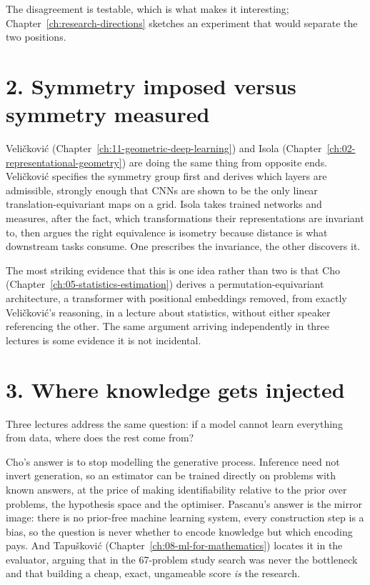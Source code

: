The disagreement is testable, which is what makes it interesting;
Chapter~\ref{ch:research-directions} sketches an experiment that would separate the two positions.

\section*{2. Symmetry imposed versus symmetry measured}

Veli\v{c}kovi\'{c} (Chapter~\ref{ch:11-geometric-deep-learning}) and Isola
(Chapter~\ref{ch:02-representational-geometry}) are doing the same thing from opposite ends.
Veli\v{c}kovi\'{c} specifies the symmetry group first and derives which layers are admissible,
strongly enough that CNNs are shown to be the only linear translation-equivariant maps on a grid.
Isola takes trained networks and measures, after the fact, which transformations their
representations are invariant to, then argues the right equivalence is isometry because distance is
what downstream tasks consume. One prescribes the invariance, the other discovers it.

The most striking evidence that this is one idea rather than two is that Cho
(Chapter~\ref{ch:05-statistics-estimation}) derives a permutation-equivariant architecture, a
transformer with positional embeddings removed, from exactly Veli\v{c}kovi\'{c}'s reasoning, in a
lecture about statistics, without either speaker referencing the other. The same argument
arriving independently in three lectures is some evidence it is not incidental.

\section*{3. Where knowledge gets injected}

Three lectures address the same question: if a model cannot learn everything from data, where does
the rest come from?

Cho's answer is to stop modelling the generative process. Inference need not invert generation, so an
estimator can be trained directly on problems with known answers, at the price of making
identifiability relative to the prior over problems, the hypothesis space and the optimiser. Pascanu's
answer is the mirror image: there is no prior-free machine learning system, every construction step
is a bias, so the question is never whether to encode knowledge but which encoding pays. And
Tapu\v{s}kovi\'{c} (Chapter~\ref{ch:08-ml-for-mathematics}) locates it in the evaluator, arguing that
in the 67-problem study search was never the bottleneck and that building a cheap, exact,
ungameable score \emph{is} the research.

